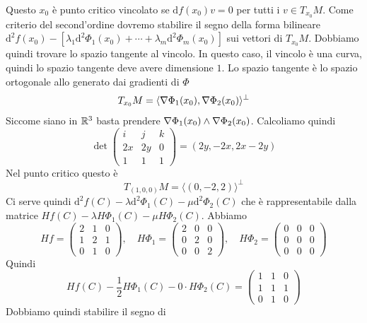 \documentclass[a4paper]{article}
\begin{document}
\begin{snippetexercise}{}
    Questo \(x_0\) è punto critico vincolato se \(\text{d}f(x_0) v = 0\)
    per tutti i \(v \in T_{x_0}M\).
    Come criterio del second'ordine dovremo stabilire il segno della forma bilineare
    \(\text{d}^2 f(x_0) - [\lambda_1 \text{d}^2 \Phi_1(x_0) + \cdots + \lambda_m \text{d}^2 \Phi_m(x_0)]\)
    sui vettori di \(T_{x_0} M\).
    Dobbiamo quindi trovare lo spazio tangente al vincolo.
    In questo caso, il vincolo è una curva, quindi lo spazio tangente deve avere dimensione \(1\).
    Lo spazio tangente è lo spazio ortogonale allo generato dai gradienti di \(\Phi\)
    \[
        T_{x_0}M = \langle \nabla \Phi_1(x_0), \nabla \Phi_2(x_0) \rangle^\perp
    \]
    Siccome siano in \(\mathbb{R}^3\) basta prendere
    \(\nabla \Phi_1(x_0) \land \nabla \Phi_2(x_0)\). Calcoliamo quindi
    \[
        \det \begin{pmatrix}
            i & j & k \\
            2x & 2y & 0 \\
            1 & 1 & 1
        \end{pmatrix} = (2y, -2x, 2x-2y)
    \]
    Nel punto critico questo è
    \[
        T_{(1,0,0)}M = \langle (0,-2,2) \rangle^\perp
    \]
    Ci serve quindi
    \(\text{d}^2 f(C) - \lambda \text{d}^2 \Phi_1(C) - \mu \text{d}^2 \Phi_2(C)\)
    che è rappresentabile dalla matrice \(Hf(C) - \lambda H\Phi_1(C) - \mu H\Phi_2(C)\).
    Abbiamo
    \[
        Hf = \begin{pmatrix}
            2 & 1 & 0 \\ 1 & 2 & 1 \\ 0 & 1 & 0
        \end{pmatrix}, \quad
        H\Phi_1 = \begin{pmatrix}
            2 & 0 & 0 \\ 0 & 2 & 0 \\ 0 & 0 & 2
        \end{pmatrix}, \quad
        H\Phi_2 = \begin{pmatrix}
            0 & 0 & 0 \\ 0 & 0 & 0 \\ 0 & 0 & 0
        \end{pmatrix}
    \]
    Quindi
    \[
        Hf(C) - \frac12 H\Phi_1(C) - 0 \cdot H \Phi_2(C) = \begin{pmatrix}
            1 & 1 & 0 \\ 1 & 1 & 1 \\ 0 & 1 & 0
        \end{pmatrix}
    \]
    Dobbiamo quindi stabilire il segno di

\end{snippetexercise}
\end{document}
